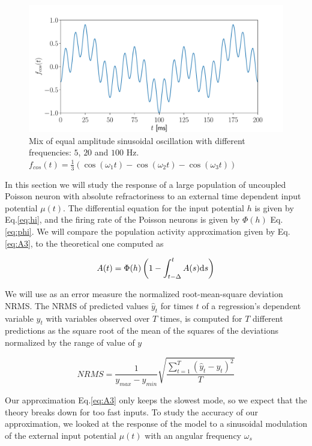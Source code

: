 \documentclass[12pt,twoside]{report}
\def \dd  {{\rm d}}
\begin{document}
\begin{figure}[h!]
	\centering
	\includegraphics[width=0.8\linewidth]{fcos.pdf}
	\caption{Mix of equal amplitude sinusoidal oscillation with different frequencies: $5$, $20$ and $100$ Hz. $f_{cos}(t)=\frac{1}{3}\left(\cos(\omega_1t)-\cos(\omega_2t)-\cos(\omega_3t)\right)$
	}
	\label{fig:fcos}
\end{figure}








In this section we will study the response of a large population of uncoupled Poisson neuron with absolute refractoriness to an external time dependent input potential $\mu(t)$. The differential equation for the input potential $h$ is given by Eq.\eqref{eq:hi}, and the firing rate of the Poisson neurons is given by $\Phi(h)$ Eq.\eqref{eq:phi}. We will compare the population activity approximation given by Eq.\eqref{eq:A3}, to the theoretical one computed as

\begin{equation}
A(t)=\Phi(h)\left(1-\int_{t-\Delta}^t A(s)\dd s\right)
\end{equation}

We will use as an error measure the normalized root-mean-square deviation NRMS.
The NRMS of predicted values $\hat {y}_t$ for times $t$ of a regression's dependent variable $y_t$ with variables observed over $T$ times, is computed for $T$ different predictions as the square root of the mean of the squares of the deviations normalized by the range of value of $y$

\begin{equation}
NRMS=\frac{1}{y_{max}-y_{min}}\sqrt{\frac{\sum_{t=1}^T(\hat{y}_t-y_t)^2}{T}}
\end{equation}

Our approximation Eq.\eqref{eq:A3} only keeps the slowest mode, so we expect that the theory breaks down for too fast inputs. To study the accuracy of our approximation, we looked at the response of the model to a sinusoidal modulation of the external input potential $\mu(t)$ with an angular frequency $\omega_s$ 
\end{document}
